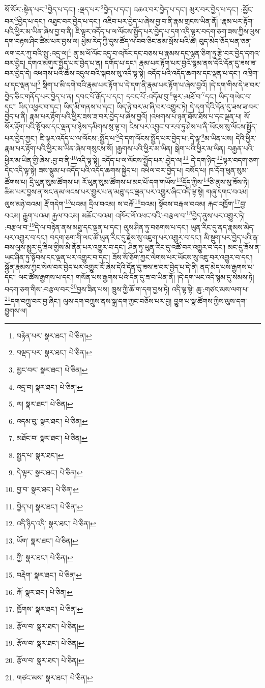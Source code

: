 སོ་སོར་:སྟེན་པར་\footnote{བརྟེན་པར་  སྣར་ཐང་།  པེ་ཅིན། }བྱེད་པ་དང་། :ལྡད་པར་\footnote{བལྡད་པར་  སྣར་ཐང་།  པེ་ཅིན། }བྱེད་པ་དང་། འཆའ་བར་བྱེད་པ་དང་། མུར་བར་བྱེད་པ་དང་། :མྱོང་བར་\footnote{མྱང་བར་  སྣར་ཐང་།  པེ་ཅིན། }བྱེད་པ་དང་། འཐུང་བར་བྱེད་པ་དང་། འཇིབ་པར་བྱེད་པ་ཞེས་བྱ་བ་ནི་རྣམ་གྲངས་ཡིན་ནོ། །རྣམ་པར་རྟོག་པའི་ཕྱིར་མ་ཡིན་ཞེས་བྱ་བ་ནི། ཇི་ལྟར་འདོད་པ་ལ་ལོངས་སྤྱོད་པར་བྱེད་པ་དག་འདི་ལྟར་བདག་ཅག་ཟས་ཀྱིས་ལུས་དག་བརྟས་ཤིང་ཚིམ་པར་བྱས་ལ། ཕྱེམ་རེད་ཀྱི་དུས་ཚོད་ལ་བབ་ཅིང་ནམ་སྲོས་པའི་ཚེ། བུད་མེད་ཅོད་པན་ཅན་ལག་ངར་ཀུ་བའི་སྤུ་:འདྲ་ལ།\footnote{འདྲ་བ།  སྣར་ཐང་།  པེ་ཅིན། } ནུ་མ་ཕོ་ལོང་འདྲ་བ་འཁོར་དང་བཅས་པ་རྣམས་དང་ལྷན་ཅིག་ཏུ་རྩེ་བར་བྱེད་དགའ་བར་བྱེད། དགའ་མགུར་སྤྱོད་པར་བྱེད་པ་ན། དགོད་པ་དང་། རྣམ་པར་རྟོག་པར་བྱའོ་སྙམ་ནས་དེའི་དོན་དུ་ཟས་ཟ་བར་བྱེད་དེ། འཕགས་པའི་ཆོས་འདུལ་བའི་སྐབས་སུ་འདི་ལྟ་སྟེ། འདོད་པའི་འདོད་ཆགས་དང་ལྡན་པ་དང་། འཁྲིག་པ་དང་ལྡན་པ།\footnote{ལ།  སྣར་ཐང་།  པེ་ཅིན། } སྡིག་པ་མི་དགེ་བའི་རྣམ་པར་རྟོག་པ་དེ་དག་ནི་རྣམ་པར་རྟོག་པ་ཞེས་བྱའོ། །དེ་དག་གིས་དེ་ཟ་བར་བྱེད་ཅིང་གནོད་པར་བྱེད་པ་ན། དབང་པོ་རྒོད་པ་དང་། དབང་པོ་:འདོམ་བུ་\footnote{འདམ་བུ་  སྣར་ཐང་།  པེ་ཅིན། }ལྟར་:མཐོ་བ་\footnote{མཐོང་བ་  སྣར་ཐང་།  པེ་ཅིན། }དང་། ཡིད་གཡེང་བ་དང་། ཡིད་འཕྱར་བ་དང་། ཡིད་མི་གནས་པ་དང་། ཡིད་ཉེ་བར་མ་ཞི་བར་འགྱུར་ཏེ། དེ་དག་དེའི་དོན་དུ་ཟས་ཟ་བར་བྱེད་པ་ནི། རྣམ་པར་རྟོག་པའི་ཕྱིར་ཟས་ཟ་བར་བྱེད་པ་ཞེས་བྱའོ། །འཕགས་པ་ཉན་ཐོས་ཐོས་པ་དང་ལྡན་པ། སོ་སོར་རྟོག་པའི་སྟོབས་དང་ལྡན་པ་ཉེས་དམིགས་སུ་ལྟ་བ། ངེས་པར་འབྱུང་བ་རབ་ཏུ་ཤེས་པ་ནི་ཡོངས་སུ་ལོངས་སྤྱོད་པར་བྱེད་ཀྱང་། ཇི་ལྟར་འདོད་པ་ལ་ལོངས་:སྤྱོད་པ་\footnote{སྤྱད་པ་  སྣར་ཐང་། }དེ་དག་ལོངས་སྤྱོད་པར་བྱེད་པ་:དེ་ལྟ་\footnote{དེ་ལྟར་  སྣར་ཐང་།  པེ་ཅིན། }མ་ཡིན་པས། དེའི་ཕྱིར་རྣམ་པར་རྟོག་པའི་ཕྱིར་མ་ཡིན་ཞེས་གསུངས་སོ། །རྒྱགས་པའི་ཕྱིར་མ་ཡིན། སྒེག་པའི་ཕྱིར་མ་ཡིན། བརྒྱན་པའི་ཕྱིར་མ་ཡིན་གྱི་ཞེས་:བྱ་བ་ནི་\footnote{བྱ་བ་  སྣར་ཐང་།  པེ་ཅིན། }འདི་ལྟ་སྟེ། འདོད་པ་ལ་ལོངས་སྤྱོད་པར་:བྱེད་ལ།\footnote{བྱེད་པ།  སྣར་ཐང་།  པེ་ཅིན། } དེ་དག་ཉིད་\footnote{འདི་ཉིད་འདི་  སྣར་ཐང་།  པེ་ཅིན། }ལྟར་བདག་ཅག་དེང་འདི་ལྟ་སྟེ། ཟས་སྣུམ་པ་འདོད་པའི་འདོད་ཆགས་སྐྱེད་པ། འཕེལ་བར་བྱེད་པ། བསོད་པ། ཁ་དོག་ཕུན་སུམ་ཚོགས་པ། དྲི་ཕུན་སུམ་ཚོགས་པ། རོ་ཕུན་སུམ་ཚོགས་པ་མང་པོ་དག་གཡོས་\footnote{ཡོག་  སྣར་ཐང་།  པེ་ཅིན། }དྲོད་ཀྱིས་\footnote{ཀྱི་  སྣར་ཐང་།  པེ་ཅིན། }ཅི་ནུས་སུ་ཟོས་ཏེ། ཚིམ་པར་བྱས་ན་སང་ནམ་ལངས་པར་གྱུར་པ་ན་མཐུ་དང་ལྡན་པར་འགྱུར་ཞིང་འདི་ལྟ་སྟེ། གཞུ་དགང་བའམ། ལུས་མཉེ་བའམ། རྡོ་གདེག་\footnote{བརྡེག་  སྣར་ཐང་།  པེ་ཅིན། }པའམ། དྲིལ་བའམ། ས་བརྐོ་\footnote{རྐོ་  སྣར་ཐང་།  པེ་ཅིན། }བའམ། སྟོབས་བརྒལ་བའམ། རྐང་འཁྱོག་\footnote{ཁྱོགས་  སྣར་ཐང་།  པེ་ཅིན། }བྱ་བའམ། རྒྱུག་པའམ། རྐྱལ་བའམ། མཆོང་བའམ། འཁོར་ལོ་འཕང་བའི་:བརྩལ་བ་\footnote{རྩོལ་བ་  སྣར་ཐང་།  པེ་ཅིན། }བྱེད་ནུས་པར་འགྱུར་ཏེ། :བརྩལ་བ་\footnote{རྩོལ་བ་  སྣར་ཐང་།  པེ་ཅིན། }དེ་ལ་བརྟེན་ནས་མཐུ་དང་ལྡན་པ་དང་། ལུས་ཤིན་ཏུ་བཅགས་པ་དང་། ཡུན་རིང་དུ་ནད་རྣམས་མེད་པར་འགྱུར་བ་དང་། བདག་ཅག་གི་ལང་ཚོ་ཡུན་རིང་དུ་རྗེས་སུ་འཇུག་པར་འགྱུར་བ་དང་། མི་སྡུག་པར་བྱེད་པའི་རྒ་བས་ལུས་མྱུར་དུ་ཟིལ་གྱིས་མི་ནོན་པར་འགྱུར་བ་དང་། ཤིན་ཏུ་ཡུན་རིང་དུ་འཚོ་བར་འགྱུར་བ་དང་། མང་དུ་ཟོས་ན་ཡང་ཤིན་ཏུ་སྟོབས་དང་ལྡན་པར་འགྱུར་བ་དང་། ཟོས་སོ་ཅོག་ཀྱང་ལེགས་པར་ཡོངས་སུ་འཇུ་བར་འགྱུར་བ་དང་། སྐྱོན་རྣམས་ཀྱང་སེལ་བར་བྱེད་པར་འགྱུར་རོ་ཞེས་དེའི་དོན་དུ་ཟས་ཟ་བར་བྱེད་པ་དེ་ནི། ནད་མེད་པས་རྒྱགས་པ་དང་། ལང་ཚོས་རྒྱགས་པ་དང་། གསོན་པས་རྒྱགས་པའི་དོན་དུ་ཟ་བ་ཡིན་ནོ། །དེ་དག་ཡང་འདི་སྙམ་དུ་སེམས་ཏེ། བདག་ཅག་གིས་:བརྩལ་བར་\footnote{རྩོལ་བ་  སྣར་ཐང་།  པེ་ཅིན། }བྱས་ཟིན་པས། ཁྲུས་ཀྱི་ཆོ་ག་དག་བྱས་ཏེ། འདི་ལྟ་སྟེ། ཆུ་:གཙང་མས་ལག་པ་\footnote{གཙང་མས་  སྣར་ཐང་།  པེ་ཅིན། }དག་བཀྲུ་བར་བྱ་ཞིང་། ལུས་དག་བཀྲུས་ནས་སྐྲ་དག་ཀྱང་བཅོས་པར་བྱ། བྱུག་པ་སྣ་ཚོགས་ཀྱིས་ལུས་དག་བྱུགས་ལ། 